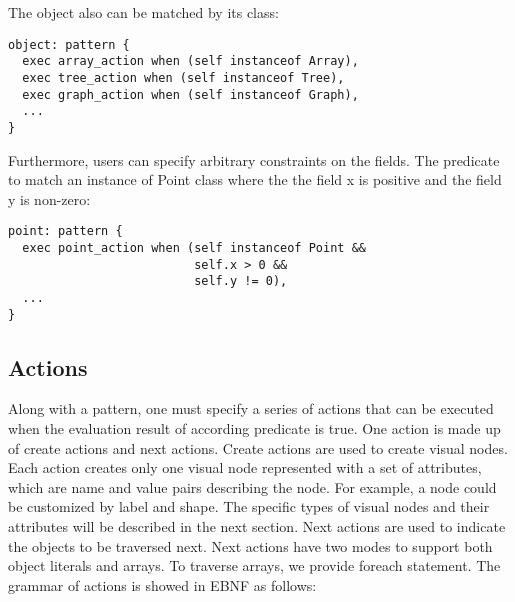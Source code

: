 The object also can be matched by its class:

\begin{lstlisting}
object: pattern {
  exec array_action when (self instanceof Array),
  exec tree_action when (self instanceof Tree),
  exec graph_action when (self instanceof Graph),
  ...
}
\end{lstlisting}

Furthermore, users can specify arbitrary constraints on the fields. The predicate to match an instance of Point class where the the field x is positive and the field y is non-zero: 

\begin{lstlisting}
point: pattern {
  exec point_action when (self instanceof Point &&
                          self.x > 0 &&
                          self.y != 0),
  ...
}
\end{lstlisting}

\subsection {Actions}

Along with a pattern, one must specify a series of actions that can be executed when the evaluation result of according predicate is true. One action is made up of create actions and next actions. Create actions are used to create visual nodes. Each action creates only one visual node represented with a set of attributes, which are name and value pairs describing the node. For example, a node could be customized by label and shape. The specific types of visual nodes and their attributes will be described in the next section. Next actions are used to indicate the objects to be traversed next. Next actions have two modes to support both object literals and arrays. To traverse arrays, we provide foreach statement. The grammar of actions is showed in EBNF as follows:

